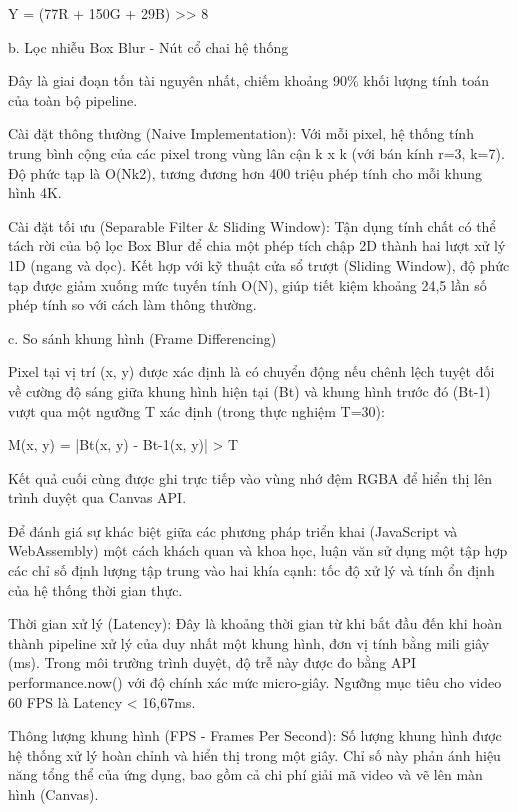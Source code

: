 Y = (77R + 150G + 29B) \textgreater{}\textgreater{} 8


b. Lọc nhiễu Box Blur - Nút cổ chai hệ thống


Đây là giai đoạn tốn tài nguyên nhất, chiếm khoảng 90\% khối lượng tính toán của toàn bộ pipeline.


Cài đặt thông thường (Naive Implementation): Với mỗi pixel, hệ thống tính trung bình cộng của các pixel trong vùng lân cận k x k (với bán kính r=3, k=7). Độ phức tạp là O(Nk2), tương đương hơn 400 triệu phép tính cho mỗi khung hình 4K.


Cài đặt tối ưu (Separable Filter \& Sliding Window): Tận dụng tính chất có thể tách rời của bộ lọc Box Blur để chia một phép tích chập 2D thành hai lượt xử lý 1D (ngang và dọc). Kết hợp với kỹ thuật cửa sổ trượt (Sliding Window), độ phức tạp được giảm xuống mức tuyến tính O(N), giúp tiết kiệm khoảng 24,5 lần số phép tính so với cách làm thông thường.


c. So sánh khung hình (Frame Differencing)


Pixel tại vị trí (x, y) được xác định là có chuyển động nếu chênh lệch tuyệt đối về cường độ sáng giữa khung hình hiện tại (Bt) và khung hình trước đó (Bt-1) vượt qua một ngưỡng T xác định (trong thực nghiệm T=30):


M(x, y) = |Bt(x, y) - Bt-1(x, y)| \textgreater{} T


Kết quả cuối cùng được ghi trực tiếp vào vùng nhớ đệm RGBA để hiển thị lên trình duyệt qua Canvas API.



Để đánh giá sự khác biệt giữa các phương pháp triển khai (JavaScript và WebAssembly) một cách khách quan và khoa học, luận văn sử dụng một tập hợp các chỉ số định lượng tập trung vào hai khía cạnh: tốc độ xử lý và tính ổn định của hệ thống thời gian thực.



Thời gian xử lý (Latency): Đây là khoảng thời gian từ khi bắt đầu đến khi hoàn thành pipeline xử lý của duy nhất một khung hình, đơn vị tính bằng mili giây (ms). Trong môi trường trình duyệt, độ trễ này được đo bằng API performance.now() với độ chính xác mức micro-giây. Ngưỡng mục tiêu cho video 60 FPS là Latency \textless{} 16,67ms.


Thông lượng khung hình (FPS - Frames Per Second): Số lượng khung hình được hệ thống xử lý hoàn chỉnh và hiển thị trong một giây. Chỉ số này phản ánh hiệu năng tổng thể của ứng dụng, bao gồm cả chi phí giải mã video và vẽ lên màn hình (Canvas).


